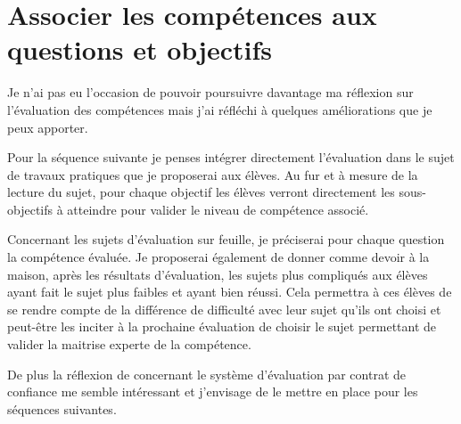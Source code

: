 \section{Associer les compétences aux questions et objectifs}

Je n'ai pas eu l'occasion de pouvoir poursuivre davantage ma réflexion sur l'évaluation des compétences mais j'ai réfléchi à quelques améliorations que je peux apporter.

Pour la séquence suivante je penses intégrer directement l'évaluation dans le sujet de travaux pratiques que je proposerai aux élèves.
Au fur et à mesure de la lecture du sujet, pour chaque objectif les élèves verront directement les sous-objectifs à atteindre pour valider le niveau de compétence associé.

Concernant les sujets d'évaluation sur feuille, je préciserai pour chaque question la compétence évaluée.
Je proposerai également de donner comme devoir à la maison, après les résultats d'évaluation, les sujets plus compliqués aux élèves ayant fait le sujet plus faibles et ayant bien réussi.
Cela permettra à ces élèves de se rendre compte de la différence de difficulté avec leur sujet qu'ils ont choisi et peut-être les inciter à la prochaine évaluation de choisir le sujet permettant de valider la maitrise experte de la compétence.

De plus la réflexion de \cite{antibi2007notes} concernant le système d'évaluation par contrat de confiance me semble intéressant et j'envisage de le mettre en place pour les séquences suivantes.



